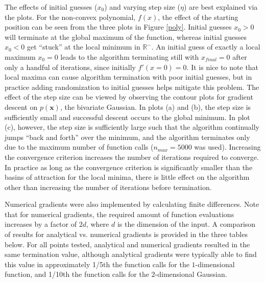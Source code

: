 \documentclass{article}
\begin{document}
The effects of initial guesses ($x_0$) and varying step size ($\eta$) are best explained via the plots.  For the non-convex polynomial, $f(x)$, the effect of the starting position can be seen from the three plots in Figure \ref{poly}.  Initial guesses $x_0 > 0$ will terminate at the global maximum of the function, whereas initial guesses $x_0 < 0$ get ``stuck'' at the local minimum in $\mathbb{R}^-$.  An initial guess of exactly a local maximum $x_0 = 0$ leads to the algorithm terminating still with $x_{final} = 0$ after only a handful of iterations, since initially $f'(x=0)=0$.  It is nice to note that local maxima can cause algorithm termination with poor initial guesses, but in practice adding randomization to initial guesses helps mitigate this problem.  The effect of the step size can be viewed by observing the contour plots for gradient descent on $p(\mathbf{x})$, the bivariate Gaussian.  In plots (a) and (b), the step size is sufficiently small and successful descent occurs to the global minimum.  In plot (c), however, the step size is sufficiently large such that the algorithm continually jumps ``back and forth'' over the minimum, and the algorithm terminates only due to the maximum number of function calls ($n_{max}=5000$ was used).  Increasing the convergence criterion increases the number of iterations required to converge.  In practice as long as the convergence criterion is significantly smaller than the basins of attraction for the local minima, there is little effect on the algorithm other than increasing the number of iterations before termination.

Numerical gradients were also implemented by calculating finite differences.  Note that for numerical gradients, the required amount of function evaluations increases by a factor of $2d$, where $d$ is the dimension of the input.  A comparison of results for analytical vs. numerical gradients is provided in the three tables below.  For all points tested, analytical and numerical gradients resulted in the same termination value, although analytical gradients were typically able to find this value in approximately 1/5th the function calls for the $1$-dimensional function, and 1/10th the function calls for the $2$-dimensional Gaussian.
\end{document}
